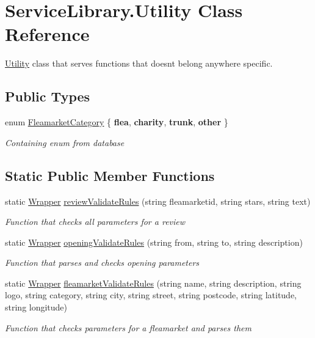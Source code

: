 \hypertarget{class_service_library_1_1_utility}{\section{Service\-Library.\-Utility Class Reference}
\label{class_service_library_1_1_utility}
}


\hyperlink{class_service_library_1_1_utility}{Utility} class that serves functions that doesnt belong anywhere specific.  


\subsection*{Public Types}
\begin{DoxyCompactItemize}
\item 
enum \hyperlink{class_service_library_1_1_utility_ab80e4b5079a093a61aa3b7e85e90f751}{Fleamarket\-Category} \{ {\bfseries flea}, 
{\bfseries charity}, 
{\bfseries trunk}, 
{\bfseries other}
 \}
\begin{DoxyCompactList}\small\item\em Containing enum from database \end{DoxyCompactList}\end{DoxyCompactItemize}
\subsection*{Static Public Member Functions}
\begin{DoxyCompactItemize}
\item 
static \hyperlink{class_service_library_1_1_wrapper}{Wrapper} \hyperlink{class_service_library_1_1_utility_aa17bea205486313547850b080f5cea9d}{review\-Validate\-Rules} (string fleamarketid, string stars, string text)
\begin{DoxyCompactList}\small\item\em Function that checks all parameters for a review \end{DoxyCompactList}\item 
static \hyperlink{class_service_library_1_1_wrapper}{Wrapper} \hyperlink{class_service_library_1_1_utility_a11e42ae7e0eabb70fdd87b64c687b2c4}{opening\-Validate\-Rules} (string from, string to, string description)
\begin{DoxyCompactList}\small\item\em Function that parses and checks opening parameters \end{DoxyCompactList}\item 
static \hyperlink{class_service_library_1_1_wrapper}{Wrapper} \hyperlink{class_service_library_1_1_utility_a4f91936b2528e48313886c219294275a}{fleamarket\-Validate\-Rules} (string name, string description, string logo, string category, string city, string street, string postcode, string latitude, string longitude)
\begin{DoxyCompactList}\small\item\em Function that checks parameters for a fleamarket and parses them \end{DoxyCompactList}\end{DoxyCompactItemize}


